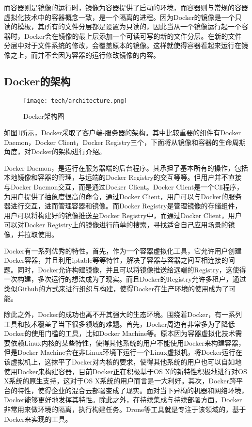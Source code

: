 而容器则是镜像的运行时，镜像为容器提供了启动的环境，而容器则与常规的容器虚拟化技术中的容器概念一致，是一个隔离的进程。因为Docker的镜像是一个只读的模板，其所有的文件分层都是设置为只读的，因此当从一个镜像运行起一个容器时，Docker会在镜像的最上层添加一个可读可写的新的文件分层。在新的文件分层中对于文件系统的修改，会覆盖原本的镜像。这样就使得容器看起来运行在镜像之上，而并不会因为容器的运行修改镜像的内容。

\subsection{Docker的架构}

\begin{figure}[!htp]
  \centering
  \texttt{[image: tech/architecture.png]}
  \caption{Docker架构图}
  \label{fig:architecture}
\end{figure}

如图\ref{fig:architecture}所示，Docker采取了客户端-服务器的架构。其中比较重要的组件有Docker Daemon，Docker Client，Docker Registry三个，下面将从镜像和容器的生命周期角度，对Docker的架构进行介绍。

Docker Daemon，是运行在服务器端的后台程序。其承担了基本所有的操作，包括本地镜像和容器的管理，与远端的Docker Registry的交互等等。但用户并不直接与Docker Daemon交互，而是通过Docker Client。Docker Client是一个Cli程序，为用户提供了抽象度很高的命令，通过Docker Client，用户可以与Docker的服务器进行交互，进而管理容器和镜像。而Docker Registry是管理镜像的存储组件，用户可以将构建好的镜像推送至Docker Registry中，而通过Docker Client，用户可以对Docker Registry上的镜像进行简单的搜索，寻找适合自己应用场景的镜像，并拉取使用。

Docker有一系列优秀的特性。首先，作为一个容器虚拟化工具，它允许用户创建Docker容器，并且利用iptable等等特性，解决了容器与容器之间互相连接的问题。同时，Docker允许构建镜像，并且可以将镜像推送给远端的Registry，这使得一次构建，多次运行的想法成为了现实。而且Docker的Registry允许多租户，通过类似Github的方式来进行组织与构建，使得Docker在生产环境的使用成为了可能。

除此之外，Docker的成功也离不开其强大的生态环境。围绕着Docker，有一系列工具和技术覆盖了当下很多领域的难题。首先，Docker周边有非常多为了降低Docker的使用门槛的工具，比如Docker Machine等。原本因为容器虚拟化技术需要依赖Linux内核的某些特性，使得其他系统的用户不能使用Docker来构建容器，但是Docker Machine会在非Linux环境下运行一个Linux虚拟机，将Docker运行在该虚拟机上，这抹平了Docker对内核的要求，使得其他系统的用户也可以自如地使用Docker来构建容器，目前Docker正在积极基于OS X的新特性积极地进行对OS X系统的原生支持，这对于OS X系统的用户而言是一大利好。其次，Docker跨平台的特性，使得企业的混合云部署变成了现实。面对当下异构的机器和网络环境，Docker能够更好地发挥其特性。除此之外，在持续集成与持续部署方面，Docker非常用来做环境的隔离，执行构建任务。Drone等工具就是专注于该领域的，基于Docker来实现的工具。

